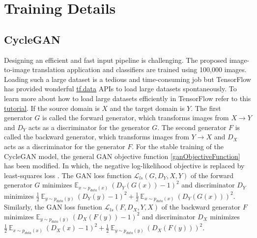 \section{Training Details}\label{TrainingDetails}




\subsection{CycleGAN}\label{TrainingDetailsCycleGAN}
Designing an efficient and fast input pipeline is challenging. The proposed image-to-image translation application and classifiers are trained using 100,000 images. Loading such a large dataset is a tedious and time-consuming job but TensorFlow has provided wonderful \href{https://www.tensorflow.org/guide/data}{tf.data} APIs to load large datasets spontaneously. To learn more about how to load large datasets efficiently in TensorFlow refer to this \href{https://www.tensorflow.org/tutorials/load_data/images}{tutorial}. If the source domain is $X$ and the target domain is $Y$. The first generator $G$ is called the forward generator, which transforms images from $X \rightarrow Y$ and $D_Y$ acts as a discriminator for the generator $G$. The second generator $F$ is called the backward generator, which transforms images from $Y \rightarrow X$ and $D_X$ acts as a discriminator for the generator $F$. For the stable training of the \ac{CycleGAN} model, the general \ac{GAN} objective function \ref{ganObjectiveFunction} has been modified. In which, the negative log-likelihood objective is replaced by least-squares loss \cite{mao2017squares}. The \ac{GAN} loss function $\mathcal{L}_{ls}(G, D_Y, X, Y)$ of the forward generator $G$ minimizes $\mathbb{E}_{x \sim p_{data}(x)}\ (D_Y(G(x)) - 1)^2$ and discriminator $D_Y$ minimizes $\frac{1}{2}\ \mathbb{E}_{y \sim p_{data}(y)}\ (D_Y(y) - 1)^2 + \frac{1}{2}\ \mathbb{E}_{x \sim p_{data}(x)}\ (D_Y(G(x)))^2$. Similarly, the \ac{GAN} loss function $\mathcal{L}_{ls}(F, D_X, Y, X)$ of the backward generator $F$ minimizes $\mathbb{E}_{y \sim p_{data}(y)}\ (D_X(F(y)) - 1)^2$ and discriminator $D_X$ minimizes $\frac{1}{2}\ \mathbb{E}_{x \sim p_{data}(x)}\ (D_X(x) - 1)^2 + \frac{1}{2}\ \mathbb{E}_{y \sim p_{data}(y)}\ (D_X(F(y)))^2$.

